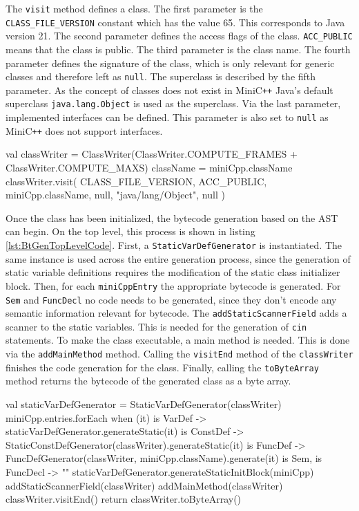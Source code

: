 The \verb|visit| method defines a class. The first parameter is the \verb|CLASS_FILE_VERSION| constant which has the value 65. This corresponds to Java version 21. The second parameter defines the access flags of the class. \verb|ACC_PUBLIC| means that the class is public. The third parameter is the class name. The fourth parameter defines the signature of the class, which is only relevant for generic classes and therefore left as \verb|null|. The superclass is described by the fifth parameter. As the concept of classes does not exist in MiniC\verb|++| Java's default superclass \verb|java.lang.Object| is used as the superclass. Via the last parameter, implemented interfaces can be defined. This parameter is also set to \verb|null| as MiniC\verb|++| does not support interfaces.

\begin{KotlinCode}[float,numbers=none,caption=Code for the definition of a class., label=lst:BtGenClassDef]
val classWriter = ClassWriter(ClassWriter.COMPUTE_FRAMES + ClassWriter.COMPUTE_MAXS)
className = miniCpp.className
classWriter.visit(
    CLASS_FILE_VERSION,
    ACC_PUBLIC,
    miniCpp.className,
    null,
    "java/lang/Object",
    null
)
\end{KotlinCode}


Once the class has been initialized, the bytecode generation based on the AST can begin. On the top level, this process is shown in listing \ref{lst:BtGenTopLevelCode}. First, a \verb|StaticVarDefGenerator| is instantiated. The same instance is used across the entire generation process, since the generation of static variable definitions requires the modification of the static class initializer block. Then, for each \verb|miniCppEntry| the appropriate bytecode is generated. For \verb|Sem| and \verb|FuncDecl| no code needs to be generated, since they don't encode any semantic information relevant for bytecode. The \verb|addStaticScannerField| adds a scanner to the static variables. This is needed for the generation of \verb|cin| statements. To make the class executable, a main method is needed. This is done via the \verb|addMainMethod| method. Calling the \verb|visitEnd| method of the \verb|classWriter| finishes the code generation for the class. Finally, calling the \verb|toByteArray| method returns the bytecode of the generated class as a byte array. 

\begin{KotlinCode}[float,numbers=none,caption=Top-level code for the bytecode generation., label=lst:BtGenTopLevelCode]
val staticVarDefGenerator = StaticVarDefGenerator(classWriter)
miniCpp.entries.forEach {
    when (it) {
       is VarDef   -> staticVarDefGenerator.generateStatic(it)
       is ConstDef -> StaticConstDefGenerator(classWriter).generateStatic(it)
       is FuncDef  -> FuncDefGenerator(classWriter, miniCpp.className).generate(it)
       is Sem,
       is FuncDecl -> ""
    }
}
staticVarDefGenerator.generateStaticInitBlock(miniCpp)
addStaticScannerField(classWriter)
addMainMethod(classWriter)
classWriter.visitEnd()
return classWriter.toByteArray()
\end{KotlinCode}

